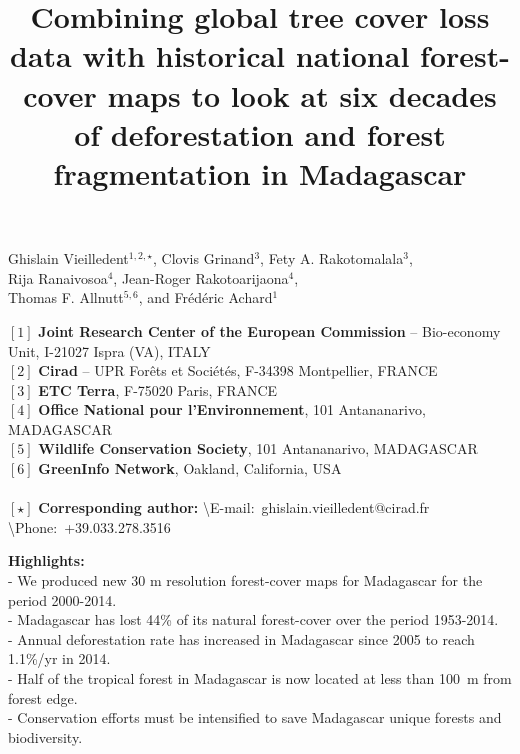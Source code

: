 \documentclass[a4paper, 12pt, leqno]{article} %
\title{Combining global tree cover loss data with historical national
  forest-cover maps to look at six decades of deforestation and forest
  fragmentation in Madagascar}
\date{}
\begin{document}
\maketitle

\vspace{-1cm}
\begin{center}
{\large
  Ghislain Vieilledent$^{1,2,\star}$, Clovis Grinand$^{3}$,
  Fety A. Rakotomalala$^{3}$,\\
  Rija Ranaivosoa$^{4}$, Jean-Roger Rakotoarijaona$^{4}$,\\
  Thomas F. Allnutt$^{5,6}$, and Frédéric Achard$^{1}$\\
}
\end{center}

\vspace{0.3cm}

{\small
  \begin{flushleft}  
    $[1]$ \textbf{Joint Research Center of the European Commission} -- Bio-economy Unit, I-21027 Ispra (VA), ITALY\\
    $[2]$ \textbf{Cirad} -- UPR Forêts et Sociétés, F-34398 Montpellier, FRANCE\\
    $[3]$ \textbf{ETC Terra}, F-75020 Paris, FRANCE\\
    $[4]$ \textbf{Office National pour l'Environnement}, 101 Antananarivo, MADAGASCAR\\
    $[5]$ \textbf{Wildlife Conservation Society}, 101 Antananarivo, MADAGASCAR\\
    $[6]$ \textbf{GreenInfo Network}, Oakland, California, USA\\
    ~\\
    $[\star]$ \textbf{Corresponding author:}
    \textbackslash{E-mail}:~ghislain.vieilledent@cirad.fr
    \textbackslash{Phone}:~+39.033.278.3516\\
  \end{flushleft}}

\vspace{0.3cm}

{\small
   \begin{flushleft}
     \textbf{Highlights:}\\
     - We produced new 30 m resolution forest-cover maps for Madagascar for the period 2000-2014.\\
     - Madagascar has lost 44\% of its natural forest-cover over the period 1953-2014.\\
     - Annual deforestation rate has increased in Madagascar since 2005 to reach 1.1\%/yr in 2014.\\
     - Half of the tropical forest in Madagascar is now located at less than 100~m from forest edge.\\
     - Conservation efforts must be intensified to save Madagascar unique forests and biodiversity.\\
   \end{flushleft}
 }
\end{document}

